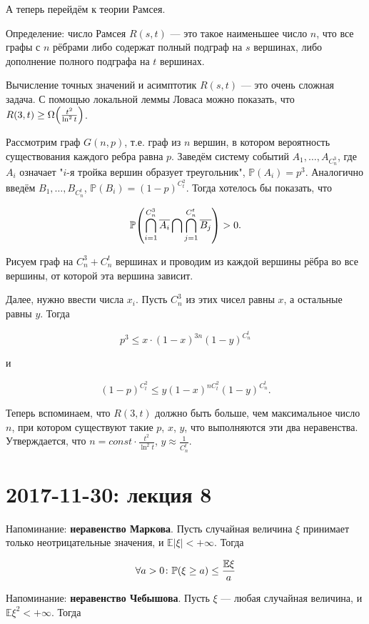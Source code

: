 \documentclass[12pt]{article}
\DeclarePairedDelimiter\autobracket{(}{)}
\newcommand{\br}[1]{\autobracket*{#1}}
\renewcommand{\P}{\mathbb{P}}
\newcommand{\E}{\mathbb{E}}
\begin{document}
\blacksquare

А теперь перейдём к теории Рамсея.

Определение: число Рамсея $R(s, t)$ — это такое наименьшее число $n$, что все графы с $n$ рёбрами либо содержат полный подграф на $s$ вершинах, либо дополнение полного подграфа на $t$ вершинах.

Вычисление точных значений и асимптотик $R(s, t)$ — это очень сложная задача. С помощью локальной леммы Ловаса можно показать, что $R(3, t) \geq \Omega \br{\frac {t^2} {\ln^2 t}}$.

Рассмотрим граф $G(n, p)$, т.е. граф из $n$ вершин, в котором вероятность существования каждого ребра равна $p$. Заведём систему событий $A_1, \ldots, A_{C^3_n}$, где $A_i$ означает "$i$-я тройка вершин образует треугольник", $\P(A_i) = p^3$. Аналогично введём $B_1, \ldots, B_{C^t_n}$, $\P(B_i) = (1 - p)^{C^2_t}$. Тогда хотелось бы показать, что

\[
\P \br{\bigcap_{i=1}^{C^3_n} \overline{A_i} \bigcap \bigcap_{j=1}^{C^t_n} \overline{B_j}} > 0.
\]

Рисуем граф на $C^3_n + C^t_n$ вершинах и проводим из каждой вершины рёбра во все вершины, от которой эта вершина зависит.

Далее, нужно ввести числа $x_i$. Пусть $C^3_n$ из этих чисел равны $x$, а остальные равны $y$. Тогда

\[
p^3 \leq x \cdot (1 - x)^{3n} (1 - y)^{C^t_n}
\]

и

\[
(1 - p)^{C^2_t} \leq y (1 - x)^{n C^2_t} (1 - y)^{C^t_n}.
\]

Теперь вспоминаем, что $R(3, t)$ должно быть больше, чем максимальное число $n$, при котором существуют такие $p$, $x$, $y$, что выполняются эти два неравенства. Утверждается, что $n = const \cdot \frac {t^2} {\ln^2 t}$, $y \approx \frac 1 {C^t_n}$.

\section{2017-11-30: лекция 8}

Напоминание: \textbf{неравенство Маркова}. Пусть случайная величина $\xi$ принимает только неотрицательные значения, и $\E |\xi| < + \infty$. Тогда

\[
\forall a > 0 \colon \P \br{\xi \geq a} \leq \frac {\E \xi} a
\]

Напоминание: \textbf{неравенство Чебышова}. Пусть $\xi$ — любая случайная величина, и $\E \xi^2 < + \infty$. Тогда
\end{document}
